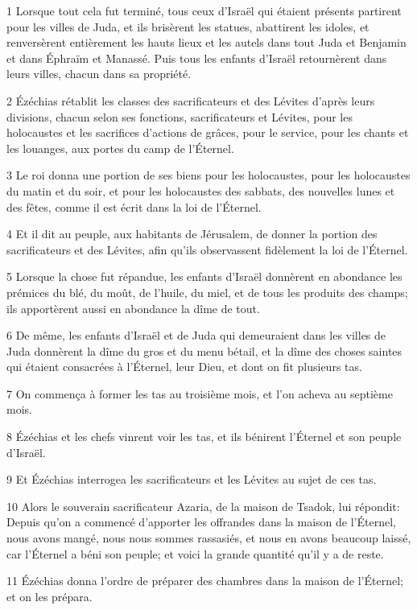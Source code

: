 \par 1 Lorsque tout cela fut terminé, tous ceux d'Israël qui étaient présents partirent pour les villes de Juda, et ils brisèrent les statues, abattirent les idoles, et renversèrent entièrement les hauts lieux et les autels dans tout Juda et Benjamin et dans Éphraïm et Manassé. Puis tous les enfants d'Israël retournèrent dans leurs villes, chacun dans sa propriété.
\par 2 Ézéchias rétablit les classes des sacrificateurs et des Lévites d'après leurs divisions, chacun selon ses fonctions, sacrificateurs et Lévites, pour les holocaustes et les sacrifices d'actions de grâces, pour le service, pour les chants et les louanges, aux portes du camp de l'Éternel.
\par 3 Le roi donna une portion de ses biens pour les holocaustes, pour les holocaustes du matin et du soir, et pour les holocaustes des sabbats, des nouvelles lunes et des fêtes, comme il est écrit dans la loi de l'Éternel.
\par 4 Et il dit au peuple, aux habitants de Jérusalem, de donner la portion des sacrificateurs et des Lévites, afin qu'ils observassent fidèlement la loi de l'Éternel.
\par 5 Lorsque la chose fut répandue, les enfants d'Israël donnèrent en abondance les prémices du blé, du moût, de l'huile, du miel, et de tous les produits des champs; ils apportèrent aussi en abondance la dîme de tout.
\par 6 De même, les enfants d'Israël et de Juda qui demeuraient dans les villes de Juda donnèrent la dîme du gros et du menu bétail, et la dîme des choses saintes qui étaient consacrées à l'Éternel, leur Dieu, et dont on fit plusieurs tas.
\par 7 On commença à former les tas au troisième mois, et l'on acheva au septième mois.
\par 8 Ézéchias et les chefs vinrent voir les tas, et ils bénirent l'Éternel et son peuple d'Israël.
\par 9 Et Ézéchias interrogea les sacrificateurs et les Lévites au sujet de ces tas.
\par 10 Alors le souverain sacrificateur Azaria, de la maison de Tsadok, lui répondit: Depuis qu'on a commencé d'apporter les offrandes dans la maison de l'Éternel, nous avons mangé, nous nous sommes rassasiés, et nous en avons beaucoup laissé, car l'Éternel a béni son peuple; et voici la grande quantité qu'il y a de reste.
\par 11 Ézéchias donna l'ordre de préparer des chambres dans la maison de l'Éternel; et on les prépara.
